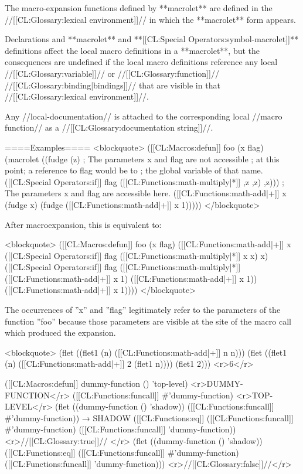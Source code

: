 The macro-expansion functions defined by **macrolet** are defined in the //[[CL:Glossary:lexical environment]]// in which the **macrolet** form appears.

Declarations and **macrolet** and **[[CL:Special Operators:symbol-macrolet]]** definitions affect the local macro definitions in a **macrolet**, but the consequences are undefined if the local macro definitions reference any local //[[CL:Glossary:variable]]// or //[[CL:Glossary:function]]// //[[CL:Glossary:binding|bindings]]// that are visible in that //[[CL:Glossary:lexical environment]]//.

Any //local-documentation// is attached to the corresponding local //macro function// as a //[[CL:Glossary:documentation string]]//.

====Examples====
<blockquote>
([[CL:Macros:defun]] foo (x flag)
  (macrolet ((fudge (z) 
               ; The parameters x and flag are not accessible 
               ; at this point; a reference to flag would be to 
               ; the global variable of that name.
               ([[CL:Special Operators:if]] flag ([[CL:Functions:math-multiply|*]] ,z ,z) ,z)))
    ; The parameters x and flag are accessible here.
    ([[CL:Functions:math-add|+]] x (fudge x) (fudge ([[CL:Functions:math-add|+]] x 1)))))
</blockquote>

After macroexpansion, this is equivalent to:

<blockquote>
([[CL:Macros:defun]] foo (x flag) 
  ([[CL:Functions:math-add|+]] x ([[CL:Special Operators:if]] flag ([[CL:Functions:math-multiply|*]] x x) x) ([[CL:Special Operators:if]] flag ([[CL:Functions:math-multiply|*]] ([[CL:Functions:math-add|+]] x 1) ([[CL:Functions:math-add|+]] x 1)) ([[CL:Functions:math-add|+]] x 1))))
</blockquote>

The occurrences of ''x'' and ''flag'' legitimately refer to the parameters of the function ''foo'' because those parameters are visible at the site of the macro call which produced the expansion.

<blockquote>
(flet ((flet1 (n) ([[CL:Functions:math-add|+]] n n)))
  (flet ((flet1 (n) ([[CL:Functions:math-add|+]] 2 (flet1 n))))
    (flet1 2))) <r>6</r>

([[CL:Macros:defun]] dummy-function () 'top-level) <r>DUMMY-FUNCTION</r>
([[CL:Functions:funcall]] #'dummy-function) <r>TOP-LEVEL</r>
(flet ((dummy-function () 'shadow))
  ([[CL:Functions:funcall]] #'dummy-function)) → SHADOW 
([[CL:Functions:eq]] ([[CL:Functions:funcall]] #'dummy-function) ([[CL:Functions:funcall]] 'dummy-function)) <r>//[[CL:Glossary:true]]// </r>
(flet ((dummy-function () 'shadow))
  ([[CL:Functions:eq]] ([[CL:Functions:funcall]] #'dummy-function) ([[CL:Functions:funcall]] 'dummy-function))) <r>//[[CL:Glossary:false]]//</r>

